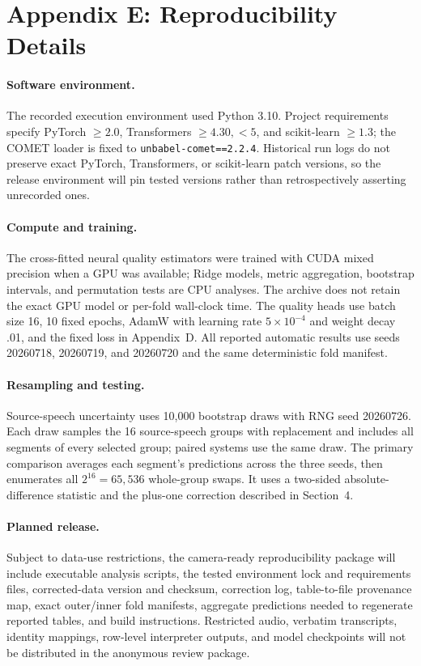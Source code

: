 \section*{Appendix E: Reproducibility Details}

\paragraph{Software environment.}
The recorded execution environment used Python 3.10. Project requirements
specify PyTorch $\geq2.0$, Transformers $\geq4.30,<5$, and scikit-learn
$\geq1.3$; the COMET loader is fixed to \texttt{unbabel-comet==2.2.4}.
Historical run logs do not preserve exact PyTorch, Transformers, or
scikit-learn patch versions, so the release environment will pin tested
versions rather than retrospectively asserting unrecorded ones.

\paragraph{Compute and training.}
The cross-fitted neural quality estimators were trained with CUDA mixed
precision when a GPU was available; Ridge models, metric aggregation,
bootstrap intervals, and permutation tests are CPU analyses. The archive does
not retain the exact GPU model or per-fold wall-clock time. The quality heads
use batch size 16, 10 fixed epochs, AdamW with learning rate
$5\times10^{-4}$ and weight decay .01, and the fixed loss in Appendix~D.
All reported automatic results use seeds 20260718, 20260719, and 20260720 and
the same deterministic fold manifest.

\paragraph{Resampling and testing.}
Source-speech uncertainty uses 10,000 bootstrap draws with RNG seed 20260726.
Each draw samples the 16 source-speech groups with replacement and includes all
segments of every selected group; paired systems use the same draw. The
primary comparison averages each segment's predictions across the three seeds,
then enumerates all $2^{16}=65{,}536$ whole-group swaps. It uses a two-sided
absolute-difference statistic and the plus-one correction described in
Section~4.

\paragraph{Planned release.}
Subject to data-use restrictions, the camera-ready reproducibility package will
include executable analysis scripts, the tested environment lock and
requirements files, corrected-data version and checksum, correction log,
table-to-file provenance map, exact outer/inner fold manifests, aggregate
predictions needed to regenerate reported tables, and build instructions.
Restricted audio, verbatim transcripts, identity mappings, row-level
interpreter outputs, and model checkpoints will not be distributed in the
anonymous review package.
